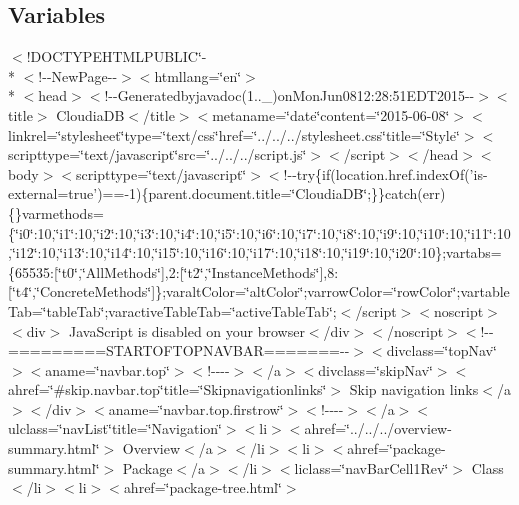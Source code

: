 \subsection*{Variables}
\begin{DoxyCompactItemize}
\item 
$<$!D\-O\-C\-T\-Y\-P\-E\-H\-T\-M\-L\-P\-U\-B\-L\-I\-C\char`\"{}-\/\\*
$<$!-\/-\/New\-Page-\/-\/$>$$<$htmllang=\char`\"{}en\char`\"{}$>$\\*
$<$head$>$$<$!-\/-\/Generatedbyjavadoc(1..\-\_)on\-Mon\-Jun0812\-:28\-:51\-E\-D\-T2015-\/-\/$>$$<$title$>$ Cloudia\-D\-B$<$/title$>$$<$metaname=\char`\"{}date\char`\"{}content=\char`\"{}2015-\/06-\/08\char`\"{}$>$$<$linkrel=\char`\"{}stylesheet\char`\"{}type=\char`\"{}text/css\char`\"{}href=\char`\"{}../../../stylesheet.\-css\char`\"{}title=\char`\"{}\-Style\char`\"{}$>$$<$scripttype=\char`\"{}text/javascript\char`\"{}src=\char`\"{}../../../script.\-js\char`\"{}$>$$<$/script$>$$<$/head$>$$<$body$>$$<$scripttype=\char`\"{}text/javascript\char`\"{}$>$$<$!-\/-\/try\{if(location.\-href.\-index\-Of('is-\/external=true')==-\/1)\{parent.\-document.\-title=\char`\"{}\-Cloudia\-D\-B\char`\"{};\}\}catch(err)\{\}varmethods=\{\char`\"{}i0\char`\"{}\-:10,\char`\"{}i1\char`\"{}\-:10,\char`\"{}i2\char`\"{}\-:10,\char`\"{}i3\char`\"{}\-:10,\char`\"{}i4\char`\"{}\-:10,\char`\"{}i5\char`\"{}\-:10,\char`\"{}i6\char`\"{}\-:10,\char`\"{}i7\char`\"{}\-:10,\char`\"{}i8\char`\"{}\-:10,\char`\"{}i9\char`\"{}\-:10,\char`\"{}i10\char`\"{}\-:10,\char`\"{}i11\char`\"{}\-:10,\char`\"{}i12\char`\"{}\-:10,\char`\"{}i13\char`\"{}\-:10,\char`\"{}i14\char`\"{}\-:10,\char`\"{}i15\char`\"{}\-:10,\char`\"{}i16\char`\"{}\-:10,\char`\"{}i17\char`\"{}\-:10,\char`\"{}i18\char`\"{}\-:10,\char`\"{}i19\char`\"{}\-:10,\char`\"{}i20\char`\"{}\-:10\};vartabs=\{65535\-:\mbox{[}\char`\"{}t0\char`\"{},\char`\"{}\-All\-Methods\char`\"{}\mbox{]},2\-:\mbox{[}\char`\"{}t2\char`\"{},\char`\"{}\-Instance\-Methods\char`\"{}\mbox{]},8\-:\mbox{[}\char`\"{}t4\char`\"{},\char`\"{}\-Concrete\-Methods\char`\"{}\mbox{]}\};varalt\-Color=\char`\"{}alt\-Color\char`\"{};varrow\-Color=\char`\"{}row\-Color\char`\"{};vartable\-Tab=\char`\"{}table\-Tab\char`\"{};varactive\-Table\-Tab=\char`\"{}active\-Table\-Tab\char`\"{};$<$/script$>$$<$noscript$>$$<$div$>$ Java\-Script is disabled on your browser$<$/div$>$$<$/noscript$>$$<$!-\/-\/=========\-S\-T\-A\-R\-T\-O\-F\-T\-O\-P\-N\-A\-V\-B\-A\-R=======-\/-\/$>$$<$divclass=\char`\"{}top\-Nav\char`\"{}$>$$<$aname=\char`\"{}navbar.\-top\char`\"{}$>$$<$!-\/-\/-\/-\/$>$$<$/a$>$$<$divclass=\char`\"{}skip\-Nav\char`\"{}$>$$<$ahref=\char`\"{}\#skip.\-navbar.\-top\char`\"{}title=\char`\"{}\-Skipnavigationlinks\char`\"{}$>$ Skip navigation links$<$/a$>$$<$/div$>$$<$aname=\char`\"{}navbar.\-top.\-firstrow\char`\"{}$>$$<$!-\/-\/-\/-\/$>$$<$/a$>$$<$ulclass=\char`\"{}nav\-List\char`\"{}title=\char`\"{}\-Navigation\char`\"{}$>$$<$li$>$$<$ahref=\char`\"{}../../../overview-\/summary.\-html\char`\"{}$>$ Overview$<$/a$>$$<$/li$>$$<$li$>$$<$ahref=\char`\"{}package-\/summary.\-html\char`\"{}$>$ Package$<$/a$>$$<$/li$>$$<$liclass=\char`\"{}nav\-Bar\-Cell1\-Rev\char`\"{}$>$ Class$<$/li$>$$<$li$>$$<$ahref=\char`\"{}package-\/tree.\-html\char`\"{}$>$ $$
\end{DoxyCompactItemize}

